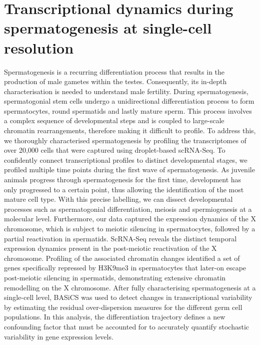 
\chapter{Transcriptional dynamics during spermatogenesis at single-cell resolution}  

\graphicspath{{"../Figs/Chapter4/"}}

\begin{Abstract}
\hspace{-5mm} Spermatogenesis is a recurring differentiation process that results in the production of male gametes within the testes. 
Consequently, its in-depth characterisation is needed to understand male fertility. 
During spermatogenesis, spermatogonial stem cells undergo a unidirectional differentiation process to form spermatocytes, round spermatids and lastly mature sperm. 
This process involves a complex sequence of developmental steps and is coupled to large-scale chromatin rearrangements, therefore making it difficult to profile. 
To address this, we thoroughly characterised spermatogenesis by profiling the transcriptomes of over 20,000 cells that were captured using droplet-based scRNA-Seq. 
To confidently connect transcriptional profiles to distinct developmental stages, we profiled multiple time points during the first wave of spermatogenesis. 
As juvenile animals progress through spermatogenesis for the first time, development has only progressed to a certain point, thus allowing the identification of the most mature cell type. 
With this precise labelling, we can dissect developmental processes such as spermatogonial differentiation, meiosis and spermiogenesis at a molecular level. 
Furthermore, our data captured the expression dynamics of the X chromosome, which is subject to meiotic silencing in spermatocytes, followed by a partial reactivation in spermatids. 
ScRNA-Seq reveals the distinct temporal expression dynamics present in the post-meiotic reactivation of the X chromosome. 
Profiling of the associated chromatin changes identified a set of genes specifically repressed by H3K9me3 in spermatocytes that later-on escape post-meiotic silencing in spermatids, demonstrating extensive chromatin remodelling on the X chromosome. 
After fully characterising spermatogenesis at a single-cell level, BASiCS was used to detect changes in transcriptional variability by estimating the residual over-dispersion measures for the different germ cell populations. 
In this analysis, the differentiation trajectory defines a new confounding factor that must be accounted for to accurately quantify stochastic variability in gene expression levels.  
\end{Abstract}

